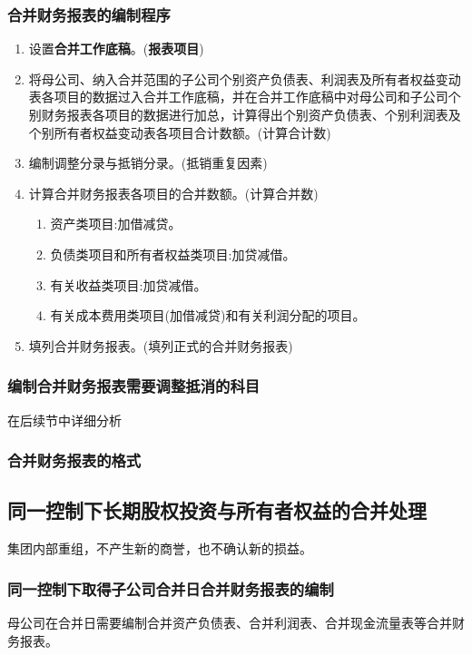 \documentclass[UTF8,12pt]{ctexart}
\numberwithin{equation}{section} %
\numberwithin{figure}{section}
\numberwithin{table}{section}
\begin{document}
	\subsubsection{合并财务报表的编制程序}
	\begin{enumerate}
		\item 设置\textbf{合并工作底稿}。(\textbf{报表项目})
		
		\item 将母公司、纳入合并范围的子公司个别资产负债表、利润表及所有者权益变动表各项目的数据过入合并工作底稿，并在合并工作底稿中对母公司和子公司个别财务报表各项目的数据进行加总，计算得出个别资产负债表、个别利润表及个别所有者权益变动表各项目合计数额。(计算合计数)
		
		\item 编制调整分录与抵销分录。(抵销重复因素)
		
		\item 计算合并财务报表各项目的合并数额。(计算合并数)
		\begin{enumerate}
			\item 资产类项目:加借减贷。
			
			\item 负债类项目和所有者权益类项目:加贷减借。
			
			\item 有关收益类项目:加贷减借。
			
			\item 有关成本费用类项目(加借减贷)和有关利润分配的项目。
		\end{enumerate}
		
		\item 填列合并财务报表。(填列正式的合并财务报表)
	\end{enumerate}
	\subsubsection{编制合并财务报表需要调整抵消的科目}
	在后续节中详细分析
	\subsubsection{合并财务报表的格式}

	\subsection{同一控制下长期股权投资与所有者权益的合并处理}
	集团内部重组，不产生新的商誉，也不确认新的损益。
	\subsubsection{同一控制下取得子公司合并日合并财务报表的编制}
	母公司在合并日需要编制合并资产负债表、合并利润表、合并现金流量表等合并财务报表。
	
\end{document}

